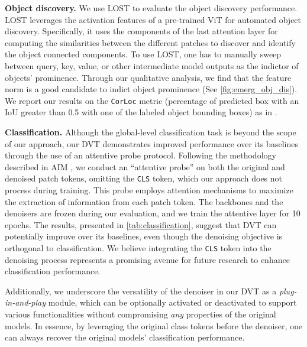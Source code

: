 \documentclass[runningheads]{llncs}
\newcommand{\ours}{DVT\xspace}
\renewcommand{\paragraph}[1]{\vspace{1.25mm}\noindent\textbf{#1}}
\begin{document}
\paragraph{Object discovery.} We use LOST \cite{simeoni2021localizing} to evaluate the object discovery performance.
LOST leverages the activation features of a pre-trained ViT for automated object discovery. Specifically, it uses the components of the last attention layer for computing the similarities between the different patches to discover and identify the object connected components.
To use LOST, one has to manually sweep between query, key, value, or other intermediate model outputs as the indictor of objects' prominence. Through our qualitative analysis, we find that the feature norm is a good candidate to indict object prominence (See \cref{fig:emerg_obj_dis}). We report our results on the \texttt{CorLoc} metric (percentage of predicted box with an IoU greater than 0.5 with one of the labeled object bounding boxes) as in \cite{simeoni2021localizing,darcet2023vision}.

\paragraph{Classification.} Although the global-level classification task is beyond the scope of our approach, our \ours demonstrates improved performance over its baselines through the use of an attentive probe protocol. Following the methodology described in AIM \cite{el2024scalable}, we conduct an ``attentive probe'' on both the original and denoised patch tokens, omitting the \texttt{CLS} token, which our approach does not process during training. This probe employs attention mechanisms to maximize the extraction of information from each patch token. The backbones and the denoisers are frozen during our evaluation, and we train the attentive layer for 10 epochs. The results, presented in \cref{tab:classification}, suggest that DVT can potentially improve over its baselines, even though the denoising objective is orthogonal to classification. We believe integrating the \texttt{CLS} token into the denoising process represents a promising avenue for future research to enhance classification performance.

Additionally, we underscore the versatility of the denoiser in our \ours as a \textit{plug-in-and-play} module, which can be optionally activated or deactivated to support various functionalities without compromising \textit{any} properties of the original models. In essence, by leveraging the original class tokens before the denoiser, one can always recover the original models' classification performance.
\end{document}

